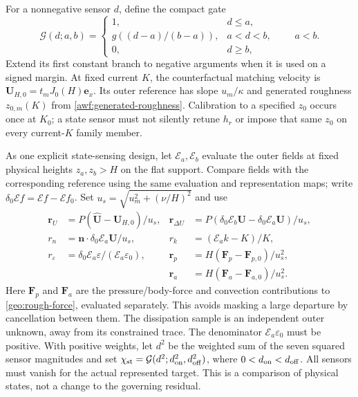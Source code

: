 \documentclass[11pt,a4paper]{article}
\numberwithin{equation}{section}
\newcommand{\eps}{\varepsilon}
\begin{document}
For a nonnegative sensor $d$, define the compact gate
\begin{equation}
 \mathcal G(d;a,b)=
 \begin{cases}
 1,&d\leq a,\\
 g((d-a)/(b-a)),&a<d<b,\\
 0,&d\geq b,
 \end{cases}
 \qquad a<b .
 \label{geo:gate}
\end{equation}
Extend its first constant branch to negative arguments when it is
used on a signed margin.  At fixed current $K$, the counterfactual
matching velocity is $\boldsymbol U_{H,0}=t_mJ_0(H)\boldsymbol e_x$.
Its outer reference has slope $u_m/\kappa$ and generated roughness
$z_{0,m}(K)$ from \cref{awf:generated-roughness}.  Calibration to a
specified $z_0$ occurs once at $K_0$; a state sensor must not silently
retune $h_r$ or impose that same $z_0$ on every current-$K$ family
member.

As one explicit state-sensing design, let $\mathcal E_a,\mathcal E_b$
evaluate the outer fields at fixed physical heights $z_a,z_b>H$ on
the flat support.  Compare fields with the corresponding reference
using the same evaluation and representation maps; write
$\delta_0\mathcal E f=\mathcal E f-\mathcal E f_0$.
Set $u_s=\sqrt{u_m^2+(\nu/H)^2}$ and use
\begin{equation}
 \begin{aligned}
 \boldsymbol r_U&=P(\widehat{\boldsymbol U}-\boldsymbol U_{H,0})/u_s,
 &\boldsymbol r_{\Delta U}&=
   P(\delta_0\mathcal E_b\boldsymbol U-
     \delta_0\mathcal E_a\boldsymbol U)/u_s,\\
 r_n&=\boldsymbol n\cdot\delta_0\mathcal E_a\boldsymbol U/u_s,
 &r_k&=(\mathcal E_a k-K)/K,\\
 r_\eps&=\delta_0\mathcal E_a\eps/(\mathcal E_a\eps_0),
 &\boldsymbol r_p&=H(\boldsymbol F_p-\boldsymbol F_{p,0})/u_s^2,\\
 &&\boldsymbol r_a&=H(\boldsymbol F_a-\boldsymbol F_{a,0})/u_s^2 .
 \end{aligned}
 \label{geo:state-sensors}
\end{equation}
Here $\boldsymbol F_p$ and $\boldsymbol F_a$ are the pressure/body-force
and convection contributions to \cref{geo:rough-force}, evaluated
separately.  This avoids masking a large departure by cancellation
between them.  The dissipation sample is an independent outer
unknown, away from its constrained trace.  The denominator
$\mathcal E_a\eps_0$ must be positive.  With positive weights,
let $d^2$ be the weighted sum of the seven squared sensor magnitudes
and set $\chi_{\rm st}=\mathcal G(d^2;d_{\rm on}^2,d_{\rm off}^2)$,
where $0<d_{\rm on}<d_{\rm off}$.  All sensors must vanish for the
actual represented target.  This is a comparison of physical
states, not a change to the governing residual.
\end{document}
